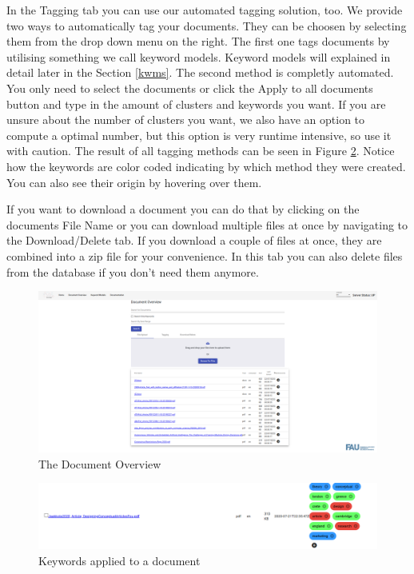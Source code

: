 \documentclass{article}
\begin{document}
In the Tagging tab you can use our automated tagging solution, too. We provide two ways to automatically tag your documents. They can be choosen by selecting them from the drop down menu on the right.
The first one tags documents by utilising something we call keyword models. Keyword models will explained in detail later in the Section \ref{kwms}.
The second method is completly automated. You only need to select the documents or click the Apply to all documents button and type in the amount of clusters and keywords you want.
If you are unsure about the number of clusters you want, we also have an option to compute a optimal number, but this option is very runtime intensive, so use it with caution.
The result of all tagging methods can be seen in Figure \ref{fig:applied_kw}. Notice how the keywords are color coded indicating by which method they were created. You can also see their origin by hovering over them.


If you want to download a document you can do that by clicking on the documents File Name or you can download multiple files at once by navigating to the Download/Delete tab.
If you download a couple of files at once, they are combined into a zip file for your convenience. In this tab you can also delete files from the database if you don't need them anymore.

\begin{figure}
    \centering
    \includegraphics[scale=0.25]{img/doc1.png}
    \caption{The Document Overview}
    \label{fig:doc_overview}
\end{figure}

\begin{figure}
    \centering
    \includegraphics[scale=0.25]{img/applied_kw.png}
    \caption{Keywords applied to a document}
    \label{fig:applied_kw}
\end{figure}
\end{document}
